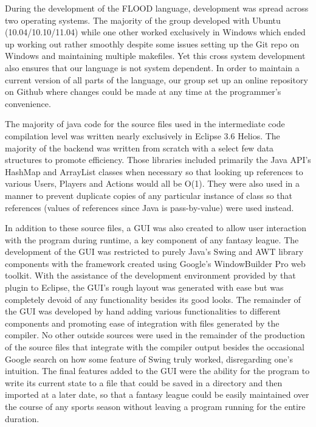 \documentclass[12pt]{report}
\begin{document}
During the development of the FLOOD language, development was spread across two operating systems. The majority of the group developed with Ubuntu (10.04/10.10/11.04) while one other worked exclusively in Windows which ended up working out rather smoothly despite some issues setting up the Git repo on Windows and maintaining multiple makefiles. Yet this cross system development also ensures that our language is not system dependent. In order to maintain a current version of all parts of the language, our group set up an online repository on Github where changes could be made at any time at the programmer’s convenience.

The majority of java code for the source files used in the intermediate code compilation level was written nearly exclusively in Eclipse 3.6 Helios. The majority of the backend was written from scratch with a select few data structures to promote efficiency. Those libraries included primarily the Java API’s HashMap and ArrayList classes when necessary so that looking up references to various Users, Players and Actions would all be O(1). They were also used in a manner to prevent duplicate copies of any particular instance of class so that references (values of references since Java is pass-by-value) were used instead.

In addition to these source files, a GUI was also created to allow user interaction with the program during runtime, a key component of any fantasy league. The development of the GUI was restricted to purely Java’s Swing and AWT library components with the framework created using Google’s WindowBuilder Pro web toolkit. With the assistance of the development environment provided by that plugin to Eclipse, the GUI’s rough layout was generated with ease but was completely devoid of any functionality besides its good looks. The remainder of the GUI was developed by hand adding various functionalities to different components and promoting ease of integration with files generated by the compiler. No other outside sources were used in the remainder of the production of the source files that integrate with the compiler output besides the occasional Google search on how some feature of Swing truly worked, disregarding one’s intuition. The final features added to the GUI were the ability for the program to write its current state to a file that could be saved in a directory and then imported at a later date, so that a fantasy league could be easily maintained over the course of any sports season without leaving a program running for the entire duration.
\end{document}
